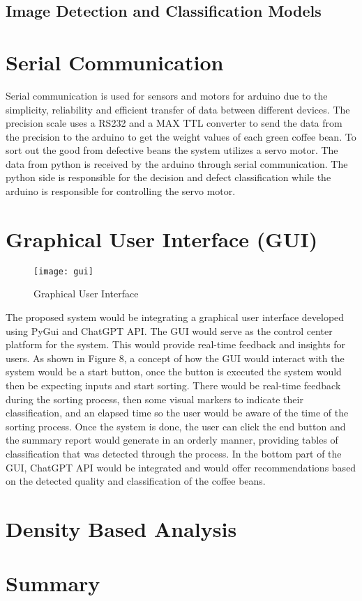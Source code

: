 \subsection{Image Detection and Classification Models}

\section{Serial Communication}

Serial communication is used for sensors and motors for arduino due to the simplicity, reliability and efficient transfer of data between different devices. The precision scale uses a RS232 and a MAX TTL converter to send the data from the precision to the arduino to get the weight values of each green coffee bean. To sort out the good from defective beans the system utilizes a servo motor. The data from python is received by the arduino through serial communication. The python side is responsible for the decision and defect classification while the arduino is responsible for controlling the servo motor.  

\section{Graphical User Interface (GUI)}

\begin{figure}[h]
    \centering
    \texttt{[image: gui]} %
    \caption{Graphical User Interface}
    \label{fig:gui}
\end{figure}

The proposed system would be integrating a graphical user interface developed using PyGui and ChatGPT API. The GUI would serve as the control center platform for the system. This would provide real-time feedback and insights for users. As shown in Figure 8, a concept of how the GUI would interact with the system would be a start button, once the button is executed the system would then be expecting inputs and start sorting. There would be real-time feedback during the sorting process, then some visual markers to indicate their classification, and an elapsed time so the user would be aware of the time of the sorting process. Once the system is done, the user can click the end button and the summary report would generate in an orderly manner, providing tables of classification that was detected through the process. In the bottom part of the GUI, ChatGPT API would be integrated and would offer recommendations based on the detected quality and classification of the coffee beans. 

\section{Density Based Analysis}

\section{Summary}
\lipsum